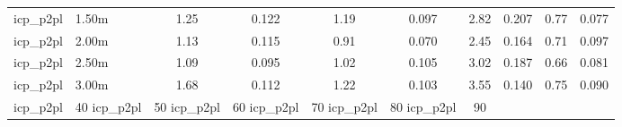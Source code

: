\begin{tabular}{llcccccccc}
icp\_p2pl & 1.50m & 1.25 & 0.122 & 1.19 & 0.097 & 2.82 & 0.207 & 0.77 & 0.077 \\
icp\_p2pl & 2.00m & 1.13 & 0.115 & 0.91 & 0.070 & 2.45 & 0.164 & 0.71 & 0.097 \\
icp\_p2pl & 2.50m & 1.09 & 0.095 & 1.02 & 0.105 & 3.02 & 0.187 & 0.66 & 0.081 \\
icp\_p2pl & 3.00m & 1.68 & 0.112 & 1.22 & 0.103 & 3.55 & 0.140 & 0.75 & 0.090 \\
icp\_p2pl & 40%
icp\_p2pl & 50%
icp\_p2pl & 60%
icp\_p2pl & 70%
icp\_p2pl & 80%
icp\_p2pl & 90%
\bottomrule
\end{tabular}
